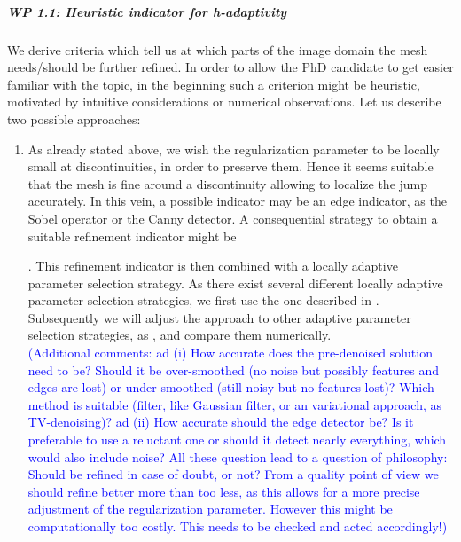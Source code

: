 \documentclass[enabledeprecatedfontcommands,cleardoublepage=empty,headsepline,twoside,11pt,DIV=15,BCOR=12mm,final]{scrartcl}
\begin{document}
 \subparagraph{WP 1.1: Heuristic indicator for h-adaptivity} We derive criteria which tell us at which parts of the image domain the mesh needs/should be further refined. In order to allow the PhD candidate to get easier familiar with the topic, in the beginning such a criterion might be heuristic, motivated by intuitive considerations or numerical observations. Let us describe two possible approaches:
\begin{enumerate}
 \item As already stated above, we wish the regularization parameter to be locally small at discontinuities, in order to preserve them. Hence it seems suitable that the mesh is fine around a discontinuity allowing to localize the jump accurately. In this vein, a possible indicator may be an edge indicator, as the Sobel operator or the Canny detector. A consequential strategy to obtain a suitable refinement indicator might be .
This refinement indicator is then combined with a locally adaptive parameter selection strategy. As there exist several different locally adaptive parameter selection strategies, we first use the one described in \cite{Lan}. Subsequently we will adjust the approach to other adaptive parameter selection strategies, as \cite{}, and compare them numerically.  \\
\textcolor{blue}{(Additional comments: ad (i) How accurate does the pre-denoised solution need to be? Should it be over-smoothed (no noise but possibly features and edges are lost) or under-smoothed (still noisy but no features lost)? Which method is suitable (filter, like Gaussian filter, or an variational approach, as TV-denoising)? ad (ii) How accurate should the edge detector be? Is it preferable to use a reluctant one or should it detect nearly everything, which would also include noise? All these question lead to a question of philosophy: Should be refined in case of doubt, or not? From a quality point of view we should refine better more than too less, as this allows for a more precise adjustment of the regularization parameter. However this might be computationally too costly. This needs to be checked and acted accordingly!)}


\end{enumerate}
\end{document}

